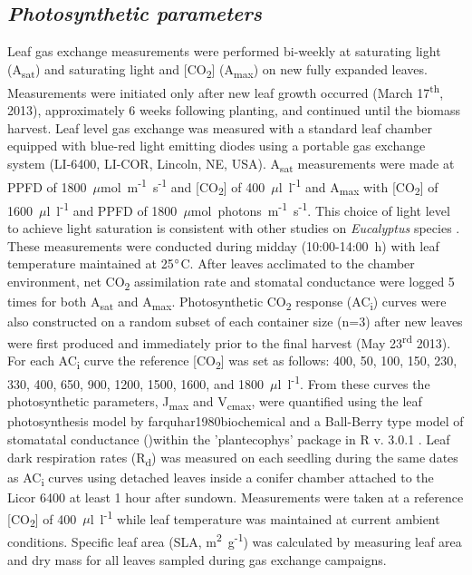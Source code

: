 \documentclass[a4paper]{article}\usepackage[]{graphicx}\usepackage[]{color}
\begin{document}
\subsection*{\textit{Photosynthetic parameters}}
Leaf gas exchange measurements were performed bi-weekly at saturating light (A\textsubscript{sat}) and saturating light and [CO\textsubscript{2}] (A\textsubscript{max}) on new fully expanded leaves. Measurements were initiated only after new leaf growth occurred (March 17\textsuperscript{th}, 2013), approximately 6 weeks following planting, and continued until the biomass harvest. Leaf level gas exchange was measured with a standard leaf chamber equipped with blue-red light emitting diodes using a portable gas exchange system (LI-6400, LI-COR, Lincoln, NE, USA). A\textsubscript{sat} measurements were made at PPFD of 1800~$\mu$mol~m\textsuperscript{-1}~s\textsuperscript{-1} and [CO\textsubscript{2}] of 400~$\mu$l~l\textsuperscript{-1} and A\textsubscript{max} with [CO\textsubscript{2}] of 1600~$\mu$l~l\textsuperscript{-1} and PPFD of 1800~$\mu$mol~photons~m\textsuperscript{-1}~s\textsuperscript{-1}. This choice of light level to achieve light saturation is consistent with other studies on \textit{Eucalyptus} species \cite{kallarackal1997ecophysiological,pinkard1998photosynthetic,crous2013photosynthesis,drake2014capacity}. These measurements were conducted during midday (10:00-14:00~h) with leaf temperature maintained at 25$\degree$C. After leaves acclimated to the chamber environment, net CO\textsubscript{2} assimilation rate and stomatal conductance were logged 5 times for both A\textsubscript{sat} and A\textsubscript{max}. Photosynthetic CO\textsubscript{2} response (AC\textsubscript{i}) curves were also constructed on a random subset of each container size (n=3) after new leaves were first produced and immediately prior to the final harvest (May 23\textsuperscript{rd} 2013). For each AC\textsubscript{i} curve the reference [CO\textsubscript{2}] was set as follows:  400, 50, 100, 150, 230, 330, 400, 650, 900, 1200, 1500, 1600, and 1800~$\mu$l~l\textsuperscript{-1}. From these curves the photosynthetic parameters, J\textsubscript{max} and V\textsubscript{cmax}, were quantified using the leaf photosynthesis model by farquhar1980biochemical and a Ball-Berry type model of stomatatal conductance ()within the 'plantecophys' package in R v. 3.0.1 \cite{plantecophys,RDevelopmentCoreTeam2011}.  Leaf dark respiration rates (R\textsubscript{d}) was measured on each seedling during the same dates as AC\textsubscript{i} curves using detached leaves inside a conifer chamber attached to the Licor 6400 at least 1 hour after sundown.   Measurements were taken at a reference [CO\textsubscript{2}] of 400~$\mu$l~l\textsuperscript{-1} while leaf temperature was maintained at current ambient conditions. Specific leaf area (SLA, m\textsuperscript{2}~g\textsuperscript{-1}) was calculated by measuring leaf area and dry mass for all leaves sampled during gas exchange campaigns.
\end{document}
